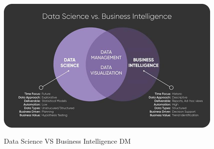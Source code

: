 \begin{figure}[H]
    \centering
    \includegraphics[width=0.8\linewidth]{imgs/10 - BI VS DS}
    \label{fig:data_science_vs_business_intelligence}
    \caption{Data Science VS Business Intelligence DM}
\end{figure}